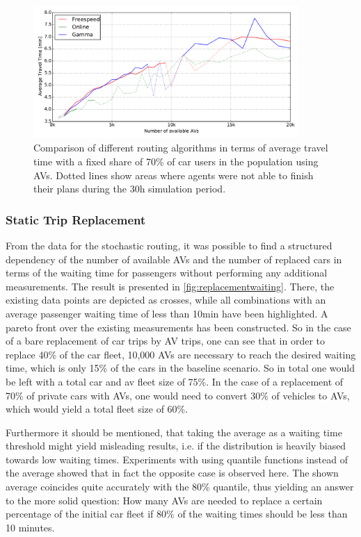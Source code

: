 \begin{figure}[h]
    \centering
    \includegraphics[width=0.9\textwidth]{figures/routing_constrained.pdf}
    \caption{Comparison of different routing algorithms in terms of average travel time with a fixed share of 70\% of car users in the population using AVs.
    Dotted lines show areas where agents were not able to finish their plans during the 30h simulation period.}
    \label{fig:routing_constrained}
\end{figure}

\FloatBarrier
\subsubsection{Static Trip Replacement}
\label{sec:replacement}

From the data for the stochastic routing, it was possible to find a structured
dependency of the number of available AVs and the number of replaced cars in
terms of the waiting time for passengers without performing any additional measurements.
The result is presented in \cref{fig:replacementwaiting}. There, the existing data
points are depicted as crosses, while all combinations with an average passenger
waiting time of less than 10min have been highlighted. A pareto front over the
existing measurements has been constructed. So in the case of a bare replacement
of car trips by AV trips, one can see that in order to replace 40\% of the car fleet,
10,000 AVs are necessary to reach the desired waiting time, which is only 15\% of
the cars in the baseline scenario. So in total one would be left with a total car and
av fleet size of 75\%. In the case of a replacement of 70\% of private cars with
AVs, one would need to convert 30\% of vehicles to AVs, which would yield a
total fleet size of 60\%.

Furthermore it should be mentioned, that taking the average as a waiting time
threshold might yield misleading results, i.e. if the distribution is heavily
biased towards low waiting times. Experiments with using quantile functions instead
of the average showed that in fact the opposite case is observed here. The shown
average coincides quite accurately with the 80\% quantile, thus yielding an answer
to the more solid question: How many AVs are needed to replace a certain percentage
of the initial car fleet if 80\% of the waiting times should be less than 10
minutes.

